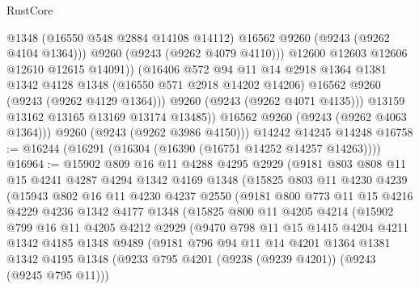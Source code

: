\begin{lexlean}{RustCore}
\begin{coremodule}
                      @1348
                      (@16550 @548 @2884 @14108 @14112)
                      @16562
                      @9260
                      (@9243 (@9262 @4104 @1364)))
                    @9260
                    (@9243 (@9262 @4079 @4110)))
                  @12600
                  @12603
                  @12606
                  @12610
                  @12615
                  @14091))
              (@16406
                @572
                @94
                @11
                @14
                @2918
                @1364
                @1381
                @1342
                @4128
                @1348
                (@16550 @571 @2918 @14202 @14206)
                @16562
                @9260
                (@9243 (@9262 @4129 @1364)))
              @9260
              (@9243 (@9262 @4071 @4135)))
            @13159
            @13162
            @13165
            @13169
            @13174
            @13485))
        @16562
        @9260
        (@9243 (@9262 @4063 @1364)))
      @9260
      (@9243 (@9262 @3986 @4150)))
    @14242
    @14245
    @14248
@16758 := @16244 (@16291 (@16304 (@16390 (@16751 @14252 @14257 @14263))))
@16964 := @15902
    @809
    @16
    @11
    @4288
    @4295
    @2929
    (@9181
      @803
      @808
      @11
      @15
      @4241
      @4287
      @4294
      @1342
      @4169
      @1348
      (@15825
        @803
        @11
        @4230
        @4239
        (@15943
          @802
          @16
          @11
          @4230
          @4237
          @2550
          (@9181
            @800
            @773
            @11
            @15
            @4216
            @4229
            @4236
            @1342
            @4177
            @1348
            (@15825
              @800
              @11
              @4205
              @4214
              (@15902
                @799
                @16
                @11
                @4205
                @4212
                @2929
                (@9470
                  @798
                  @11
                  @15
                  @1415
                  @4204
                  @4211
                  @1342
                  @4185
                  @1348
                  @9489
                  (@9181
                    @796
                    @94
                    @11
                    @14
                    @4201
                    @1364
                    @1381
                    @1342
                    @4195
                    @1348
                    (@9233 @795 @4201 (@9238 (@9239 @4201)) (@9243 (@9245 @795 @11)))

\end{coremodule}
\end{lexlean}

